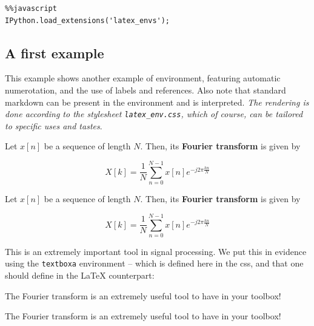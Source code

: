 \begin{verbatim}
%%javascript 
IPython.load_extensions('latex_envs');
\end{verbatim}

    \subsection{A first example}\label{a-first-example}

    This example shows another example of environment, featuring automatic
numerotation, and the use of labels and references. Also note that
standard markdown can be present in the environment and is interpreted.
\emph{The rendering is done according to the stylesheet
\texttt{latex\_env.css}, which of course, can be tailored to specific
uses and tastes}.

    \begin{listing}
\begin{definition}
\label{def:FT} Let $x[n]$ be a sequence of length $N$. Then, its
\textbf{Fourier transform} is given by

\begin{equation}
\label{eq:FT}
X[k]= \frac{1}{N} \sum_{n=0}^{N-1} x[n] e^{-j2\pi \frac{kn}{N}}
\end{equation}
\end{definition}
\end{listing}

    \begin{definition}
\label{def:FT} Let $x[n]$ be a sequence of length $N$. Then, its
\textbf{Fourier transform} is given by

\begin{equation}
\label{eq:FT2}
X[k]= \frac{1}{N} \sum_{n=0}^{N-1} x[n] e^{-j2\pi \frac{kn}{N}}
\end{equation}
\end{definition}

    This is an extremely important tool in signal processing. We put this in
evidence using the \texttt{textboxa} environment -- which is defined
here in the css, and that one should define in the LaTeX counterpart:

\begin{listing}
\begin{textboxa}
The Fourier transform is an extremely useful tool to have in your toolbox!
\end{textboxa}
\end{listing}

    \begin{textboxa}
The Fourier transform is an extremely useful tool to have in your toolbox!
\end{textboxa}


